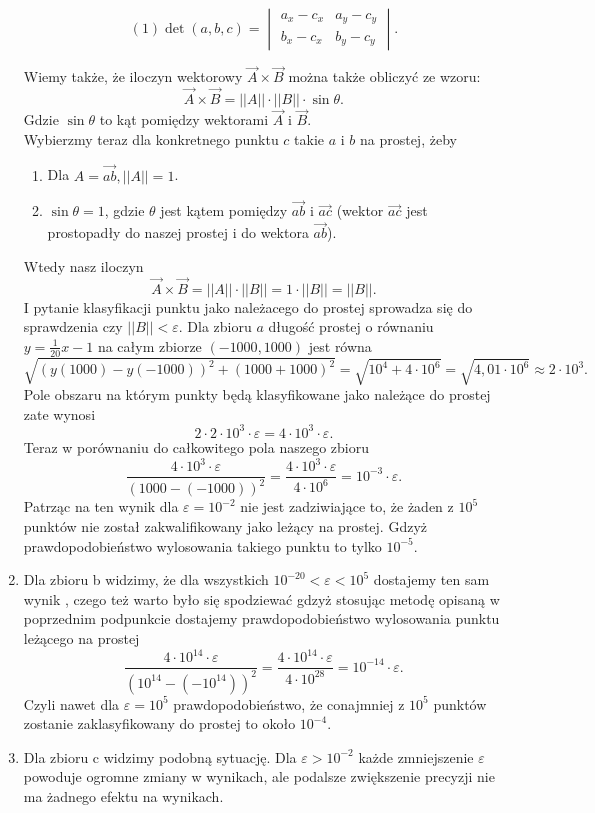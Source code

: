 \begin{enumerate}
$$
(1)\det(a, b, c)= \begin{vmatrix}
       a_{x} - c_{x} & a_{y} - c_{y} \\
       b_{x} - c_{x} & b_{y} - c_{y} 
              \end{vmatrix}.
$$\par
Wiemy także, że iloczyn wektorowy $\overrightarrow{A} \times \overrightarrow{B}$ można także obliczyć ze wzoru: 
$$
\overrightarrow{A} \times \overrightarrow{B} = ||A|| \cdot ||B|| \cdot \sin{\theta}.
$$
\quad Gdzie $\sin{\theta}$ to kąt pomiędzy wektorami $\overrightarrow{A}$ i $\overrightarrow{B}$.\\
Wybierzmy teraz dla konkretnego punktu $c$ takie $a$ i $b$ na prostej, żeby 
\begin{enumerate}
    \item Dla $A = \overrightarrow{ab}, ||{A}|| = 1$.
    \item $\sin{\theta} = 1$, gdzie $\theta$ jest kątem pomiędzy $\overrightarrow{ab}$ i $\overrightarrow{ac}$ (wektor $\overrightarrow{ac}$ jest prostopadły do naszej prostej i do wektora $\overrightarrow{ab}$).
\end{enumerate}
Wtedy nasz iloczyn $$\overrightarrow{A} \times \overrightarrow{B} = ||A|| \cdot ||B|| = 1 \cdot ||B|| = ||B||.$$
\quad I pytanie klasyfikacji punktu jako należacego do prostej sprowadza się do sprawdzenia czy $||B|| < \varepsilon$.
Dla zbioru $a$ długość prostej o równaniu $y = \frac{1}{20}x - 1$ na całym zbiorze $(-1000, 1000)$ jest równa 
$$
    \sqrt{(y(1000) - y(-1000))^2 + (1000 + 1000)^2} = \sqrt{10 ^ 4 + 4 \cdot 10^6} = \sqrt{4,01 \cdot 10^6} \approx 2 \cdot 10^3.
$$
Pole obszaru na którym punkty będą klasyfikowane jako należące do prostej zate wynosi
$$
    2 \cdot 2 \cdot 10^3 \cdot \varepsilon = 4 \cdot 10^3 \cdot \varepsilon.
$$
Teraz w porównaniu do całkowitego pola naszego zbioru
$$
    \frac{4 \cdot 10^3 \cdot \varepsilon}{(1000 - (-1000))^2}=
    \frac{4 \cdot 10^3 \cdot \varepsilon}{4 \cdot 10^6} =  10^{-3} \cdot \varepsilon.
$$
\quad Patrząc na ten wynik dla $\varepsilon = 10^{-2}$ nie jest zadziwiające to, że 
żaden z $10^5$ punktów nie został zakwalifikowany jako leżący na prostej. Gdzyż prawdopodobieństwo 
wylosowania takiego punktu to tylko $10^{-5}$.
\item \quad Dla zbioru b widzimy, że dla wszystkich $10^{-20} < \varepsilon < 10^5$ dostajemy ten sam wynik 
, czego też warto było się spodziewać gdzyż stosując metodę opisaną w poprzednim podpunkcie dostajemy 
prawdopodobieństwo wylosowania punktu leżącego na prostej 
$$
    \frac{4 \cdot 10^{14} \cdot \varepsilon}{(10^{14} - (-10^{14}))^2}=
    \frac{4 \cdot 10^{14} \cdot \varepsilon}{4 \cdot 10^{28}} =  10^{-14} \cdot \varepsilon.
$$
\quad Czyli nawet dla $\varepsilon = 10^5$ prawdopodobieństwo, że conajmniej z $10^5$ punktów zostanie zaklasyfikowany 
do prostej to około $10^{-4}$.
\item \quad Dla zbioru c widzimy podobną sytuację. Dla $\varepsilon > 10^{-2}$ 
każde zmniejszenie $\varepsilon$ powoduje ogromne zmiany w wynikach, ale podalsze zwiększenie precyzji 
nie ma żadnego efektu na wynikach.


\end{enumerate}
